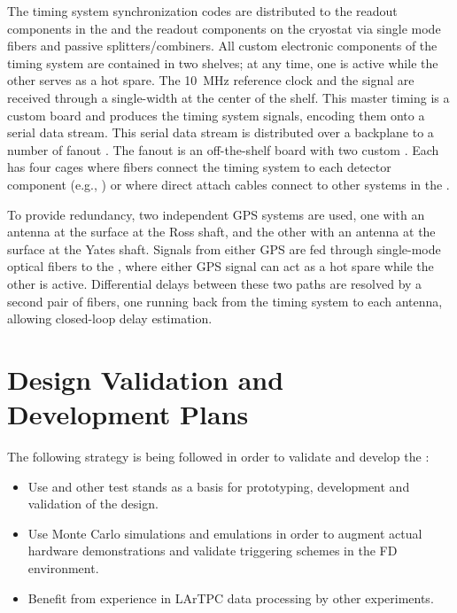 The timing system synchronization codes are distributed to the  readout components in the  and the readout components on the cryostat via single mode fibers and passive splitters/combiners.
All custom electronic components of the timing system are contained in two  shelves; at any time, one is active while the other serves as a hot spare.
The \SI{10}{MHz} reference clock and the  signal are received through a single-width  at the center of the  shelf.
This master timing  is a custom board and produces the timing system signals, encoding them onto a serial data stream.
This serial data stream is distributed over a backplane to a number of fanout .
The fanout  is an off-the-shelf board with two custom .
Each  has four  cages where fibers connect the timing system to each detector component (e.g., ) or where direct attach cables connect to other systems in the .

To provide redundancy, two independent GPS systems are used,
one with an antenna at the surface at the Ross shaft, and the other
with an antenna at the surface at the Yates shaft. Signals from either
GPS are fed through single-mode optical fibers to the , where
either GPS signal can act as a hot spare while the other is active. 
Differential delays between these two paths are resolved by a second pair of fibers, one running back from the timing system to each antenna, allowing closed-loop delay estimation.


\section{Design Validation and Development Plans}
\label{sec:fd-daq:validation}

The following strategy is being followed in order to validate and
develop the   :
\begin{itemize}
\item Use  and other test stands as a basis for prototyping, development and validation
of the  design.
\item Use Monte Carlo simulations and emulations in order to augment actual hardware
demonstrations and validate triggering schemes in the FD environment.
\item Benefit from experience in LArTPC data processing by other experiments.
\end{itemize}


